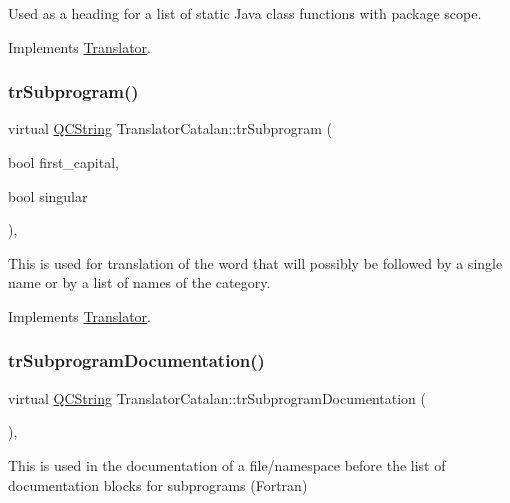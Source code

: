 Used as a heading for a list of static Java class functions with package scope. 

Implements \mbox{\hyperlink{class_translator}{Translator}}.

\mbox{\label{class_translator_catalan_a328ad6fb8c14c14f8501ce06b092d22d}} 
\subsubsection{\texorpdfstring{trSubprogram()}{trSubprogram()}}
{\footnotesize\ttfamily virtual \mbox{\hyperlink{class_q_c_string}{Q\+C\+String}} Translator\+Catalan\+::tr\+Subprogram (\begin{DoxyParamCaption}\item[{bool}]{first\+\_\+capital,  }\item[{bool}]{singular }\end{DoxyParamCaption})\hspace{0.3cm}{\ttfamily [inline]}, {\ttfamily [virtual]}}

This is used for translation of the word that will possibly be followed by a single name or by a list of names of the category. 

Implements \mbox{\hyperlink{class_translator}{Translator}}.

\mbox{\label{class_translator_catalan_a81e8da4ec550e8dbd24137d605631291}} 
\subsubsection{\texorpdfstring{trSubprogramDocumentation()}{trSubprogramDocumentation()}}
{\footnotesize\ttfamily virtual \mbox{\hyperlink{class_q_c_string}{Q\+C\+String}} Translator\+Catalan\+::tr\+Subprogram\+Documentation (\begin{DoxyParamCaption}{ }\end{DoxyParamCaption})\hspace{0.3cm}{\ttfamily [inline]}, {\ttfamily [virtual]}}

This is used in the documentation of a file/namespace before the list of documentation blocks for subprograms (Fortran) 

